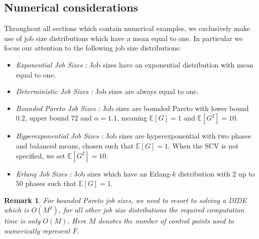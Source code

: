 \documentclass[12pt]{report}
\newcommand{\E}{\mathbb{E}}
\newtheorem{remark}{Remark}
\begin{document}
\subsection{Numerical considerations}\label{sec:algorithm}
Throughout all sections which contain numerical examples, we exclusively make use of job size distributions which have a mean equal to one. In particular we focus our attention to the following job size distributions:
\begin{itemize}
\item \textit{Exponential Job Sizes : } Job sizes have an exponential distribution with mean equal to one.
\item \textit{Deterministic Job Sizes : } Job sizes are always equal to one.
\item \textit{Bounded Pareto Job Sizes : } Job sizes are bounded Pareto with lower bound $0.2$, upper bound $72$ and $\alpha=1.1$, meaning $\E[G]=1$ and $\E[G^2]=10$.
\item \textit{Hyperexponential Job Sizes : } Job sizes are hyperexponential with two phases and balanced means, chosen such that $\E[G]=1$. When the SCV is not specified, we set $\E[G^2]=10$.
\item \textit{Erlang Job Sizes : } Job sizes which have an Erlang-$k$ distribution with $2$ up to $50$ phases such that $\E[G]=1$.
\end{itemize}
\begin{remark}
For bounded Pareto job sizes, we need to resort to solving a DIDE which is $O(M^2)$, for all other job size distributions the required computation time is only $O(M)$. Here $M$ denotes the number of control points used to numerically represent $\bar F$.
\end{remark}
\end{document}
